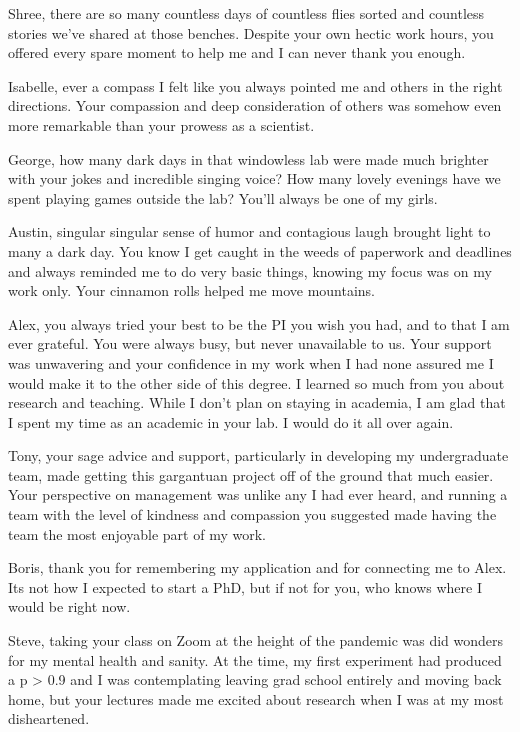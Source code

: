 \documentclass[12pt,reqno,oneside]{report}
\begin{document}
Shree, there are so many countless days of countless flies sorted and countless stories we've shared at those benches. Despite your own hectic work hours, you offered every spare moment to help me and I can never thank you enough. 

Isabelle, ever a compass I felt like you always pointed me and others in the right directions. Your compassion and deep consideration of others was somehow even more remarkable than your prowess as a scientist. 

George, how many dark days in that windowless lab were made much brighter with your jokes and incredible singing voice? How many lovely evenings have we spent playing games outside the lab? You'll always be one of my girls.

Austin, singular singular sense of humor and contagious laugh brought light to many a dark day. You know I get caught in the weeds of paperwork and deadlines and always reminded me to do very basic things, knowing my focus was on my work only. Your cinnamon rolls helped me move mountains. 

Alex, you always tried your best to be the PI you wish you had, and to that I am ever grateful. You were always busy, but never unavailable to us. Your support was unwavering and your confidence in my work when I had none assured me I would make it to the other side of this degree. I learned so much from you about research and teaching. While I don't plan on staying in academia, I am glad that I spent my time as an academic in your lab. I would do it all over again.

Tony, your sage advice and support, particularly in developing my undergraduate team, made getting this gargantuan project off of the ground that much easier. Your perspective on management was unlike any I had ever heard, and running a team with the level of kindness and compassion you suggested made having the team the most enjoyable part of my work.

Boris, thank you for remembering my application and for connecting me to Alex. Its not how I expected to start a PhD, but if not for you, who knows where I would be right now.

Steve, taking your class on Zoom at the height of the pandemic was did wonders for my mental health and sanity. At the time, my first experiment had produced a p > 0.9 and I was contemplating leaving grad school entirely and moving back home, but your lectures made me excited about research when I was at my most disheartened. 
\end{document}
